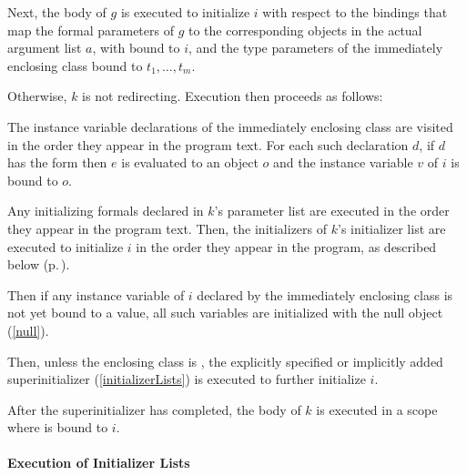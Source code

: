 \documentclass[makeidx]{article}
\begin{document}
\LMHash{}%
Next, the body of $g$ is executed to initialize $i$ with respect to the bindings that map
the formal parameters of $g$ to the corresponding objects in the actual argument list $a$,
with \THIS{} bound to $i$,
and the type parameters of the immediately enclosing class bound to $t_1, \ldots, t_m$.

\LMHash{}%
Otherwise, $k$ is not redirecting.
Execution then proceeds as follows:

\LMHash{}%
The instance variable declarations of the immediately enclosing class are visited in the order they appear in the program text.
For each such declaration $d$, if $d$ has the form
then $e$ is evaluated to an object $o$
and the instance variable $v$ of $i$ is bound to $o$.

\LMHash{}%
Any initializing formals declared in $k$'s parameter list are executed in the order they appear in the program text.
Then, the initializers of $k$'s initializer list are executed to initialize $i$
in the order they appear in the program, as described below
(p.\,\pageref{executionOfInitializerLists}).


\LMHash{}%
Then if any instance variable of $i$ declared by the immediately enclosing class
is not yet bound to a value,
all such variables are initialized with the null object (\ref{null}).

\LMHash{}%
Then, unless the enclosing class is , the explicitly specified or
implicitly added superinitializer (\ref{initializerLists}) is executed to
further initialize $i$.

\LMHash{}%
After the superinitializer has completed, the body of $k$ is executed in a scope where \THIS{} is bound to $i$.



\paragraph{Execution of Initializer Lists}
\end{document}
